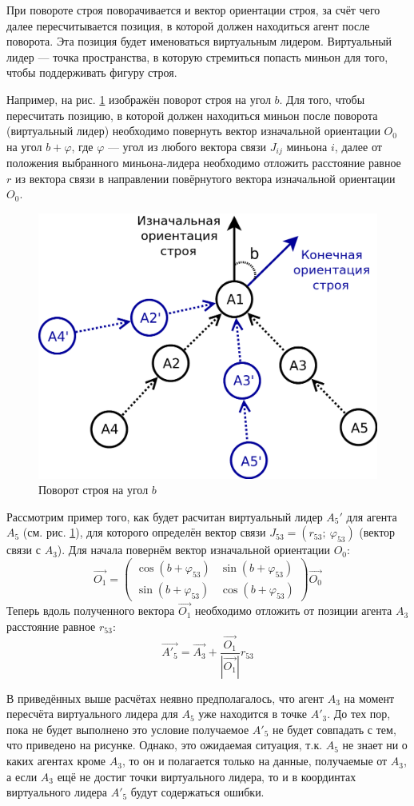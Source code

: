 \documentclass[12pt,a4paper]{article}
\begin{document}
При повороте строя поворачивается и вектор ориентации строя, за счёт чего далее пересчитывается позиция, в которой должен находиться агент после поворота. Эта позиция будет именоваться виртуальным лидером. Виртуальный лидер — точка пространства, в которую стремиться попасть миньон для того, чтобы поддерживать фигуру строя. \par
Например, на рис. \ref{fig:wedge-platoon-rotation} изображён поворот строя на угол $b$. Для того, чтобы пересчитать позицию, в которой должен находиться миньон после поворота (виртуальный лидер) необходимо повернуть вектор изначальной ориентации $O_{0}$ на угол $b + \varphi$, где $\varphi$ — угол из любого вектора связи $J_{ij}$ миньона $i$, далее от положения выбранного миньона-лидера необходимо отложить расстояние равное $r$ из вектора связи в направлении повёрнутого вектора изначальной ориентации $O_0$. 
\par
\begin{figure}[!htbp]
	\centering
	\includegraphics[width=0.5\linewidth]{platoon/wedge-platoon-rotation}
	\caption{Поворот строя на угол $b$}
	\label{fig:wedge-platoon-rotation}
\end{figure}
Рассмотрим пример того, как будет расчитан виртуальный лидер $A_5'$ для агента $A_5$ (см. рис. \ref{fig:wedge-platoon-rotation}), для которого определён вектор связи $J_{53} = (r_{53}; \ \varphi_{53})$ (вектор связи с $A_3$). Для начала повернём вектор изначальной ориентации $O_{0}$:
$$\vec{O_{1}} =  \left(\begin{array}{cc} \cos{(b + \varphi_{53})} & \sin{(b + \varphi_{53})}\\ \sin{(b + \varphi_{53})} & \cos{(b + \varphi_{53})} \end{array}\right) \vec{O_{0}} $$
Теперь вдоль полученного вектора $\vec{O_1}$ необходимо отложить от позиции агента $A_3$ расстояние равное $r_{53}$:
$$ \vec{A'_{5}} = \vec{A_3} + \frac{\vec{O_1}}{|\vec{O_1}|} r_{53}$$
\par
В приведённых выше расчётах неявно предполагалось, что агент $A_3$ на момент пересчёта виртуального лидера для $A_5$ уже находится в точке $A'_3$. До тех пор, пока не будет выполнено это условие получаемое $A'_5$ не будет совпадать с тем, что приведено на рисунке. Однако, это ожидаемая ситуация, т.к. $A_5$ не знает ни о каких агентах кроме $A_3$, то он и полагается только на данные, получаемые от $A_3$, а если $A_3$ ещё не достиг точки виртуального лидера, то и в координтах виртуального лидера $A'_5$ будут содержаться ошибки. \par
\end{document}
